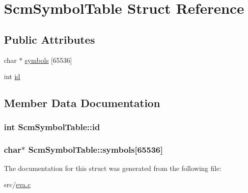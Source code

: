 \hypertarget{struct_scm_symbol_table}{\section{Scm\-Symbol\-Table Struct Reference}
\label{struct_scm_symbol_table}
}
\subsection*{Public Attributes}
\begin{DoxyCompactItemize}
\item 
char $\ast$ \hyperlink{struct_scm_symbol_table_a7517a8cd5230367851dc067a6d6b3a68}{symbols} \mbox{[}65536\mbox{]}
\item 
int \hyperlink{struct_scm_symbol_table_a478872d19da2b7ac9a816a3b1537d3be}{id}
\end{DoxyCompactItemize}


\subsection{Member Data Documentation}
\hypertarget{struct_scm_symbol_table_a478872d19da2b7ac9a816a3b1537d3be}{
\subsubsection[{id}]{\setlength{\rightskip}{0pt plus 5cm}int Scm\-Symbol\-Table\-::id}}\label{struct_scm_symbol_table_a478872d19da2b7ac9a816a3b1537d3be}
\hypertarget{struct_scm_symbol_table_a7517a8cd5230367851dc067a6d6b3a68}{
\subsubsection[{symbols}]{\setlength{\rightskip}{0pt plus 5cm}char$\ast$ Scm\-Symbol\-Table\-::symbols\mbox{[}65536\mbox{]}}}\label{struct_scm_symbol_table_a7517a8cd5230367851dc067a6d6b3a68}


The documentation for this struct was generated from the following file\-:\begin{DoxyCompactItemize}
\item 
src/\hyperlink{eva_8c}{eva.\-c}\end{DoxyCompactItemize}
